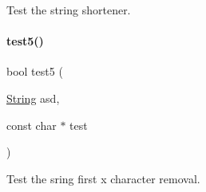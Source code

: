 Test the string shortener. 

\mbox{\label{atest_8cpp_a07323edca3eb4730f312846bd8714d4a}} 
\paragraph{\texorpdfstring{test5()}{test5()}}
{\footnotesize\ttfamily bool test5 (\begin{DoxyParamCaption}\item[{\mbox{\hyperlink{class_string}{String}}}]{asd,  }\item[{const char $\ast$}]{test }\end{DoxyParamCaption})}



Test the sring first x character removal. 

